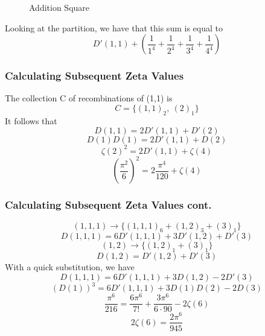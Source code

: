\documentclass{beamer}
\begin{document}
\begin{frame}
\begin{figure}[ht]
  	\caption{Addition Square}
  \end{figure}
  Looking at the partition, we have that this sum is equal to
  \[D'(1,1) + \left(\frac{1}{1^4} + \frac{1}{2^4} + \frac{1}{3^4} + \frac{1}{4^4}\right)\]
\end{frame}

\begin{frame}
  \frametitle{Calculating Subsequent Zeta Values}
  The collection C of recombinations of (1,1) is
  \[C = \{(1,1)_2,\ (2)_1\}\]
  It follows that
  \[D(1,1) = 2D'(1,1) + D'(2)\]
  \[D(1)D(1) = 2D'(1,1) + D(2)\]
  \[\zeta(2)^2 = 2D'(1,1) + \zeta(4)\]
  \[\left(\frac{\pi^2}{6}\right)^2=2\frac{\pi^4}{120} + \zeta(4)\]
\end{frame}

\begin{frame}
  \frametitle{Calculating Subsequent Zeta Values cont.}
  \[(1,1,1) \rightarrow \{(1,1,1)_6 +(1,2)_3 + (3)_1\}\]
  \[D(1,1,1) = 6D'(1,1,1) + 3D'(1,2) + D'(3)\]
    \[(1,2) \rightarrow \{(1,2)_1 + (3)_1\}\]
  \[D(1,2) = D'(1,2) + D'(3)\]
  With a quick substitution, we have
  \[D(1,1,1) = 6D'(1,1,1) + 3D(1,2) - 2D'(3)\]
  \[\left(D(1)\right)^3 = 6D'(1,1,1) + 3D(1)D(2) - 2D(3)\]
  \[\frac{\pi^6}{216} = \frac{6\pi^6}{7!} + \frac{3\pi^6}{6\cdot 90} -2\zeta(6)\]
  \[2\zeta(6) = \frac{2\pi^6}{945}\]
\end{frame}
\end{document}
